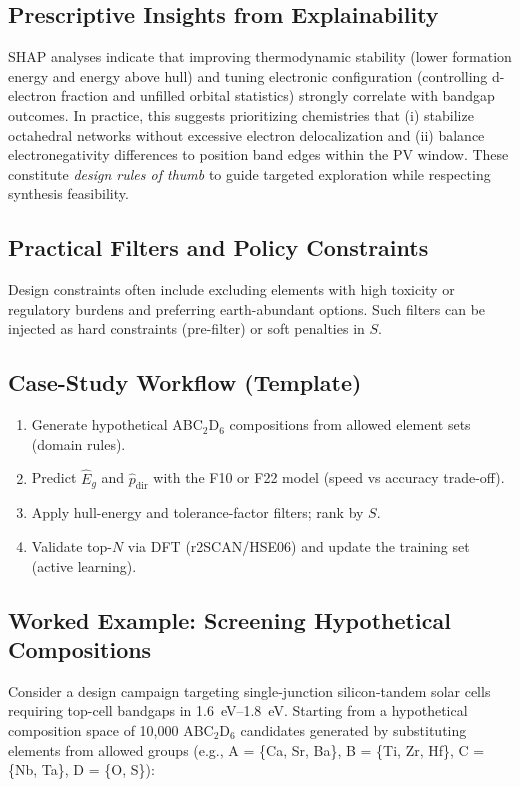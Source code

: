 \documentclass[conference]{IEEEtran}
\begin{document}
\subsection{Prescriptive Insights from Explainability}
SHAP analyses indicate that improving thermodynamic stability (lower formation energy and energy above hull) and tuning electronic configuration (controlling d-electron fraction and unfilled orbital statistics) strongly correlate with bandgap outcomes. In practice, this suggests prioritizing chemistries that (i) stabilize octahedral networks without excessive electron delocalization and (ii) balance electronegativity differences to position band edges within the PV window. These constitute \emph{design rules of thumb} to guide targeted exploration while respecting synthesis feasibility.

\subsection{Practical Filters and Policy Constraints}
Design constraints often include excluding elements with high toxicity or regulatory burdens and preferring earth-abundant options. Such filters can be injected as hard constraints (pre-filter) or soft penalties in $S$.

\subsection{Case-Study Workflow (Template)}
\begin{enumerate}
  \item Generate hypothetical ABC$_2$D$_6$ compositions from allowed element sets (domain rules).
  \item Predict $\hat{E}_g$ and $\hat{p}_{\mathrm{dir}}$ with the F10 or F22 model (speed vs accuracy trade-off).
  \item Apply hull-energy and tolerance-factor filters; rank by $S$.
  \item Validate top-$N$ via DFT (r2SCAN/HSE06) and update the training set (active learning).
\end{enumerate}

\subsection{Worked Example: Screening Hypothetical Compositions}
Consider a design campaign targeting single-junction silicon-tandem solar cells requiring top-cell bandgaps in \SIrange{1.6}{1.8}{\electronvolt}. Starting from a hypothetical composition space of 10,000 ABC$_2$D$_6$ candidates generated by substituting elements from allowed groups (e.g., A = \{Ca, Sr, Ba\}, B = \{Ti, Zr, Hf\}, C = \{Nb, Ta\}, D = \{O, S\}):
\end{document}
